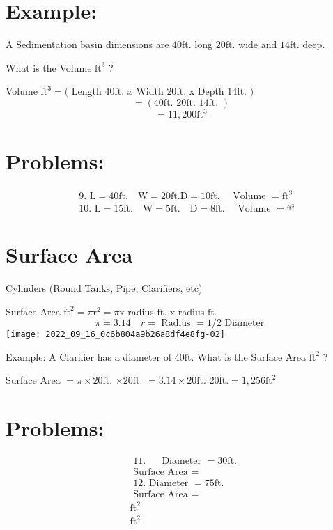 \begin{enumerate}
\section{Example:}
A Sedimentation basin dimensions are $40 \mathrm{ft}$. long $20 \mathrm{ft}$. wide and $14 \mathrm{ft}$. deep.

What is the Volume $\mathrm{ft}^{3}$ ?

Volume $\mathrm{ft}^{3}=($ Length $40 \mathrm{ft}$. $x$ Width $20 \mathrm{ft}$. x Depth $14 \mathrm{ft}$. $)$
$$
=(40 \mathrm{ft} \text {. } 20 \mathrm{ft} \text {. } 14 \mathrm{ft} \text {. })
$$
$$
=11,200 \mathrm{ft}^{3}
$$

\section{Problems:}
$$
\begin{aligned}
& \text { 9. } \mathrm{L}=40 \mathrm{ft} . \quad \mathrm{W}=20 \mathrm{ft} . \mathrm{D}=10 \mathrm{ft} . \quad \text { Volume }=\mathrm{ft}^{3} \\
& \text { 10. } \mathrm{L}=15 \mathrm{ft} . \quad \mathrm{W}=5 \mathrm{ft} . \quad \mathrm{D}=8 \mathrm{ft} . \quad \text { Volume }=\stackrel{\mathrm{ft}^{3}}{ }
\end{aligned}
$$

\section{Surface Area}
Cylinders (Round Tanks, Pipe, Clarifiers, etc)

Surface Area $\mathrm{ft}^{2}=\pi \mathrm{r}^{2}=\pi \mathrm{x}$ radius $\mathrm{ft}$. $\mathrm{x}$ radius $\mathrm{ft}$.
$$
\pi=3.14 \quad r=\text { Radius }=1 / 2 \text { Diameter }
$$
\texttt{[image: 2022\_09\_16\_0c6b804a9b26a8df4e8fg-02]}

Example: A Clarifier has a diameter of $40 \mathrm{ft}$. What is the Surface Area $\mathrm{ft}^{2}$ ?

Surface Area $=\pi \times 20 \mathrm{ft}$. $\times 20 \mathrm{ft}$. $=3.14 \times 20 \mathrm{ft}$. $20 \mathrm{ft} .=1,256 \mathrm{ft}^{2}$

\section{Problems:}
$$
\begin{aligned}
& \text { 11. } \quad \text { Diameter }=30 \mathrm{ft} \text {. } \\
& \text { Surface Area }= \\
& \text { 12. Diameter }=75 \mathrm{ft} \text {. } \\
& \text { Surface Area }= \\
& \mathrm{ft}^{2} \\
& \mathrm{ft}^{2}
\end{aligned}
$$


\end{enumerate}
